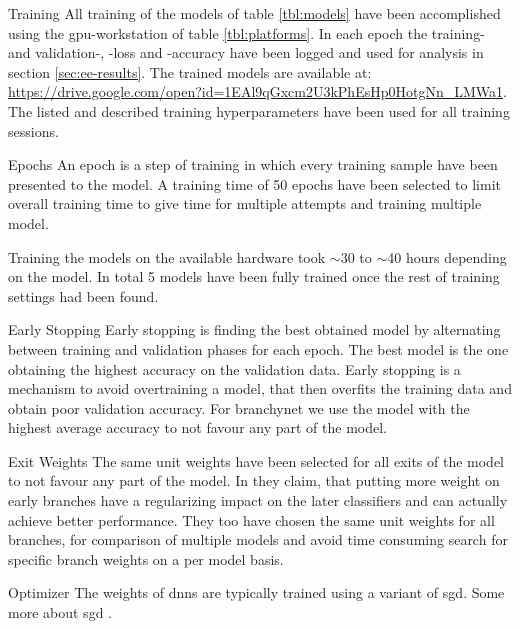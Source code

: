 \begin{enumdescript}
	\item[Training] All training of the models of table \ref{tbl:models} have been accomplished using the \gls{gpu}-workstation of table \ref{tbl:platforms}. In each epoch the training- and validation-, -loss and -accuracy have been logged and used for analysis in section \ref{sec:ee-results}. The trained models are available at: {\color{sns-grey}\url{https://drive.google.com/open?id=1EAl9qGxcm2U3kPhEsHp0HotgNn_LMWa1}}.
	The listed and described training hyperparameters have been used for all training sessions. 
	
	\begin{enumdescript}
		\item[Epochs] An epoch is a step of training in which every training sample have been presented to the model. A training time of 50 epochs have been selected to limit overall training time to give time for multiple attempts and training multiple model.
		
		Training the models on the available hardware took $\sim$30 to  $\sim$40 hours depending on the model. In total 5 models have been fully trained once the rest of training settings had been found.
		
		\item[Early Stopping] Early stopping is finding the best obtained model by alternating between training and validation phases for each epoch. The best model is the one obtaining the highest accuracy on the validation data. Early stopping is a mechanism to avoid overtraining a model, that then overfits the training data and obtain poor validation accuracy. For \gls{branchynet} we use the model with the highest average accuracy to not favour any part of the model.  
		
		\item[Exit Weights] The same unit weights have been selected for all exits of the model to not favour any part of the model. In \cite{teerapittayanon_branchynet:_2016} they claim, that putting more weight on early branches have a regularizing impact on the later classifiers and can actually achieve better performance. They too have chosen the same unit weights for all branches, for comparison of multiple models and avoid time consuming search for specific branch weights on a per model basis.
		
		\item[Optimizer] The weights of \gls{dnn}s are typically trained using a variant of \gls{sgd}. Some more about \gls{sgd} \cite{goodfellow_deep_2016}.
		

\end{enumdescript}
\end{enumdescript}
